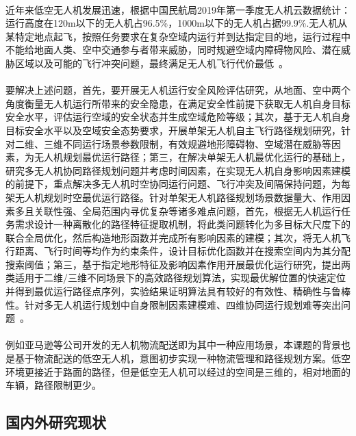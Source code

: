 \documentclass[UTF8,a4paper]{ctexart}
\begin{document}
\paragraph{}近年来低空无人机发展迅速，根据中国民航局2019年第一季度无人机云数据统计：运行高度在120m以下的无人机占96.5\%，1000m以下的无人机占据99.9\%.无人机从某特定地点起飞，按照任务要求在复杂空域内运行并到达指定目的地，运行过程中不能给地面人类、空中交通参与者带来威胁，同时规避空域内障碍物风险、潜在威胁区域以及可能的飞行冲突问题，最终满足无人机飞行代价最低~\cite{kopardekar2016unmanned}。
\paragraph{}要解决上述问题，首先，要开展无人机运行安全风险评估研究，从地面、空中两个角度衡量无人机运行所带来的安全隐患，在满足安全性前提下获取无人机自身目标安全水平，评估运行空域的安全状态并生成空域危险等级；其次，基于无人机自身目标安全水平以及空域安全态势要求，开展单架无人机自主飞行路径规划研究，针对二维、三维不同运行场景参数限制，有效规避地形障碍物、空域潜在威胁等因素，为无人机规划最优运行路径；第三，在解决单架无人机最优化运行的基础上，研究多无人机协同路径规划问题并考虑时间因素，在实现无人机自身影响因素建模的前提下，重点解决多无人机时空协同运行问题、飞行冲突及间隔保持问题，为每架无人机规划时空最优运行路径。针对单架无人机路径规划场景数据量大、作用因素多且关联性强、全局范围内寻优复杂等诸多难点问题，首先，根据无人机运行任务需求设计一种离散化的路径特征提取机制，将此类问题转化为多目标大尺度下的联合全局优化，然后构造地形函数并完成所有影响因素的建模；其次，将无人机飞行距离、飞行时间等均作为约束条件，设计目标优化函数并在搜索空间内为其分配搜索阈值；第三，基于指定地形特征及影响因素作用开展最优化运行研究，提出两类适用于二维/三维不同场景下的高效路径规划算法，实现最优解位置的快速定位并得到最优运行路径点序列，实验结果证明算法具有较好的有效性、精确性与鲁棒性。针对多无人机运行规划中自身限制因素建模难、四维协同运行规划难等突出问题~\cite{liuyang}。
\paragraph{}例如亚马逊等公司开发的无人机物流配送即为其中一种应用场景，本课题的背景也是基于物流配送的低空无人机，意图初步实现一种物流管理和路径规划方案。低空环境更接近于路面的路径，但是低空无人机可以经过的空间是三维的，相对地面的车辆，路径限制更少。
\subsection{国内外研究现状}
\end{document}
